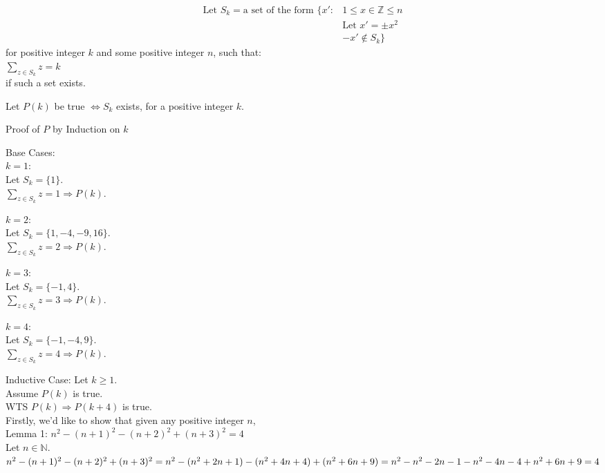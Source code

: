 \documentclass[fleqn]{article}
\begin{document}
\begin{align*}
  \text{Let } S_{k} = \text{a set of the form }
                      \lbrace x' : & 1 \leq x \in \mathbb{Z} \leq n \\
                                   & \text{Let } x' = \pm x^2 \\
                                   & -x' \not\in S_{k}
                      \rbrace
\end{align*}
for positive integer $k$ and some positive integer $n$, such that:\\
$\displaystyle\sum\limits_{z \in S_{k}} z = k$\\
if such a set exists.

Let $P(k)$ be true $\Leftrightarrow S_{k} $ exists, for a positive integer $k$.

Proof of $P$ by Induction on $k$

Base Cases:\\
$k = 1:$\\
Let $S_{k} = \lbrace 1 \rbrace$.\\
$\displaystyle\sum\limits_{z \in S_{k}} z = 1 \Rightarrow P(k)$.

$k = 2:$\\
Let $S_{k} = \lbrace 1,-4,-9,16 \rbrace$.\\
$\displaystyle\sum\limits_{z \in S_{k}} z = 2 \Rightarrow P(k)$.

$k = 3:$\\
Let $S_{k} = \lbrace-1,4\rbrace$.\\
$\displaystyle\sum\limits_{z \in S_{k}} z = 3 \Rightarrow P(k)$.

$k = 4:$\\
Let $S_{k} = \lbrace -1,-4,9 \rbrace$.\\
$\displaystyle\sum\limits_{z \in S_{k}} z = 4 \Rightarrow P(k)$.

Inductive Case: Let $k \geq 1$.\\
Assume $P(k)$ is true.\\
WTS $P(k) \Rightarrow P(k+4)$ is true.\\
Firstly, we'd like to show that given any positive integer $n$, \\
Lemma 1: $n^2 - (n+1)^2 - (n+2)^2 + (n+3)^2 = 4$\\
Let $n \in \mathbb{N}$.\\
$n^2 - (n+1) ^2 - (n+2)^2 + (n+3)^2 =\\
n^2 - (n^2 + 2n + 1) - (n^2 + 4n + 4) + (n^2 + 6n + 9) =\\
n^2 - n^2 - 2n - 1 - n^2 - 4n - 4 + n^2 + 6n + 9 = \\
4 $
\end{document}

